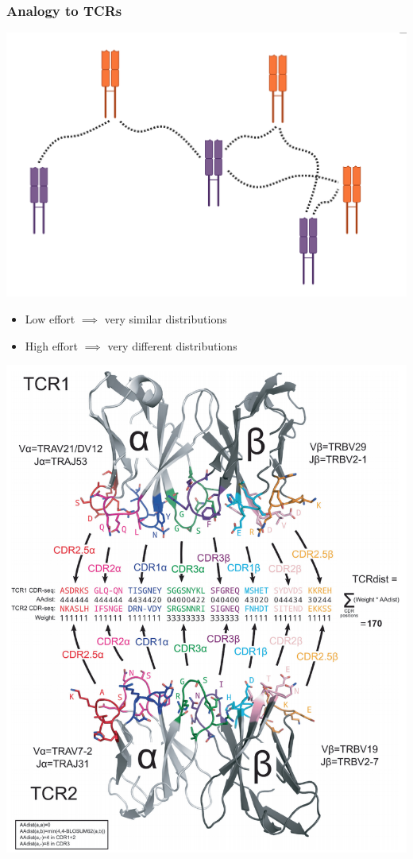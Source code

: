 \documentclass[mathserif,compress,xcolor={dvipsnames}]{beamer}
\renewcommand\;{\,}
\begin{document}
\begin{frame}\frametitle{Analogy to TCRs}
\begin{center}
\includegraphics[width=0.9\linewidth]{Images/TCR_soldier_mapping.png}
\begin{itemize}
\item[]
Low effort $\implies$ very similar distributions 
\item[]
High effort $\implies$ very different distributions 
\end{itemize}
\end{center}
\end{frame}

\begin{frame}
\begin{center}
\includegraphics[width=0.7\linewidth]{Images/TCRdist.png}
\end{center}
\end{frame}
\end{document}
